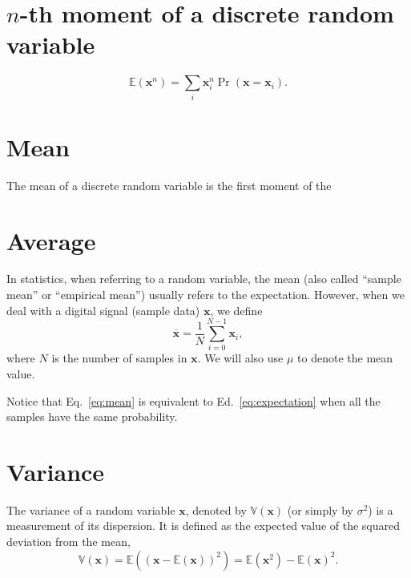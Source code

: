 \section{$n$-th moment of a discrete random variable}
\begin{equation}
  \mathbb{E}(\mathbf{x}^n) = \sum_i\mathbf{x}_i^n\Pr(\mathbf{x}=\mathbf{x}_i).
\end{equation}
  
\section{Mean}
\label{sec:mean}
The mean of a discrete random variable is the first moment of the  

\section{Average}
\label{sec:average}
In statistics, when referring to a random variable, the mean (also
called ``sample mean'' or ``empirical mean'') usually refers to the
expectation. However, when we deal with a digital signal (sample data)
$\mathbf{x}$, we define
\begin{equation}
  \overline{\mathbf{x}} = \frac{1}{N}\sum_{i=0}^{N-1}\mathbf{x}_i,
  \label{eq:mean}
\end{equation}
where $N$ is the number of samples in $\mathbf{x}$. We will also use
$\mu$ to denote the mean value.

Notice that Eq.~\ref{eq:mean} is equivalent to
Ed.~\ref{eq:expectation} when all the samples have the same
probability.


\section{Variance}
\label{sec:variance}

The variance of a random variable $\mathbf{x}$, denoted by
$\mathbb{V}(\mathbf{x})$ (or simply by $\sigma^2$) is a measurement of
its dispersion. It is defined as the expected value of the squared
deviation from the mean,
\begin{equation}
  \mathbb{V}(\mathbf{x}) = \mathbb{E}\left((\mathbf{x} - \mathbb{E}(\mathbf{x}))^2 \right) = \mathbb{E}(\mathbf{x}^2)-\mathbb{E}(\mathbf{x})^2.
  \label{eq:variance}
\end{equation}


